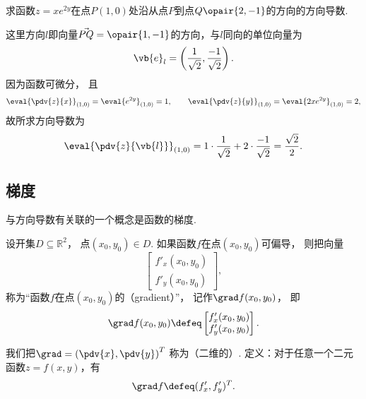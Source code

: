\begin{example}
求函数\(z = x e^{2y}\)在点\(P(1,0)\)处沿从点\(P\)到点\(Q\opair{2,-1}\)的方向的方向导数.
\begin{solution}
这里方向\(l\)即向量\(\vec{PQ} = \opair{1,-1}\)的方向，与\(l\)同向的单位向量为\begin{equation*}
	\vb{e}_l
	= \left(
		\frac{1}{\sqrt{2}},
		\frac{-1}{\sqrt{2}}
	\right).
\end{equation*}
因为函数可微分，
且\begin{equation*}
	\eval{\pdv{z}{x}}_{(1,0)}
	= \eval{e^{2y}}_{(1,0)}
	= 1,
	\qquad
	\eval{\pdv{z}{y}}_{(1,0)}
	= \eval{2xe^{2y}}_{(1,0)}
	= 2,
\end{equation*}
故所求方向导数为\begin{equation*}
	\eval{\pdv{z}{\vb{l}}}_{(1,0)}
	= 1 \cdot \frac{1}{\sqrt{2}} + 2 \cdot \frac{-1}{\sqrt{2}}
	= \frac{\sqrt{2}}{2}.
\end{equation*}
\end{solution}
\end{example}

\subsection{梯度}
与方向导数有关联的一个概念是函数的梯度.
\begin{definition}
设开集\(D \subseteq \mathbb{R}^2\)，
点\((x_0,y_0) \in D\).
如果函数\(f\)在点\((x_0,y_0)\)可偏导，
则把向量\begin{equation*}
	\begin{bmatrix}
		f'_x(x_0,y_0) \\
		f'_y(x_0,y_0)
	\end{bmatrix},
\end{equation*}称为“函数\(f\)在点\((x_0,y_0)\)的（gradient）”，
记作\(\grad f(x_0,y_0)\)，
即\begin{equation*}
	\grad f(x_0,y_0)
	\defeq
	\begin{bmatrix}
		f'_x(x_0,y_0) \\
		f'_y(x_0,y_0)
	\end{bmatrix}.
\end{equation*}
\end{definition}

我们把\(\grad = \left(\pdv{x},\pdv{y}\right)^T\)
称为（二维的）.
定义：对于任意一个二元函数\(z=f(x,y)\)，有\begin{equation*}
	\grad f
	\defeq
	(f'_x,f'_y)^T.
\end{equation*}

